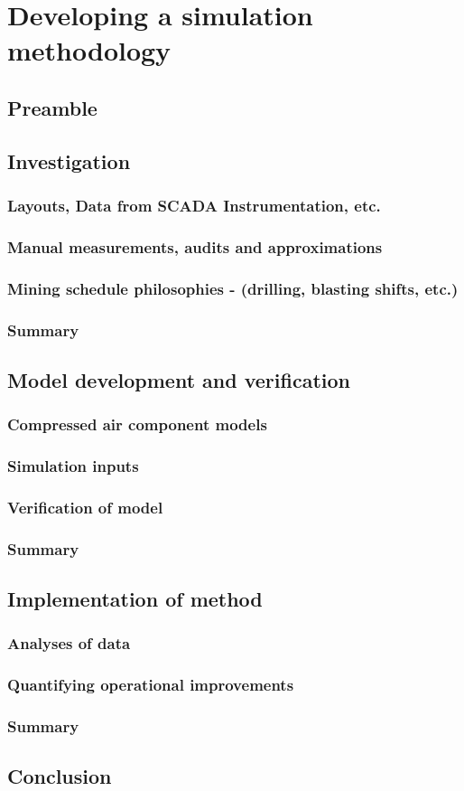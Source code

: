 \chapter{Developing a simulation methodology}
\section{Preamble}
\section{Investigation}
	\subsection{Layouts, Data from SCADA Instrumentation, etc.}
	\subsection{Manual measurements, audits and approximations}
	\subsection{Mining schedule philosophies \color{blue} - (drilling, blasting shifts, etc.)}
	\subsection{Summary}
\section{Model development and verification}
	\subsection{Compressed air component models}
	\subsection{Simulation inputs}
	\subsection{Verification of model}
	\subsection{Summary}
\section{Implementation of method}
	\subsection{Analyses of data}
	\subsection{Quantifying operational improvements}
	\subsection{Summary}
\section{Conclusion}